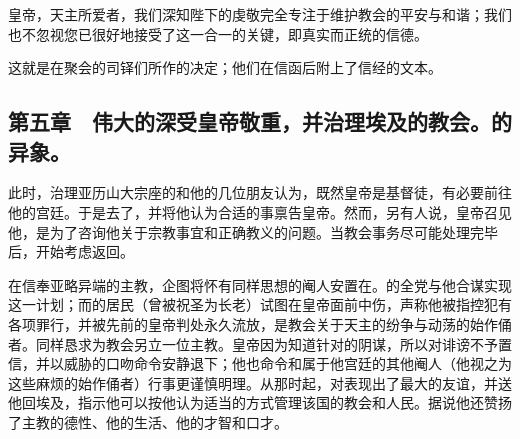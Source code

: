 皇帝，天主所爱者，我们深知陛下的虔敬完全专注于维护教会的平安与和谐；我们也不忽视您已很好地接受了这一合一的关键，即真实而正统的信德。\par

\par

这就是在聚会的司铎们所作的决定；他们在信函后附上了信经的文本。\par


\subsection{第五章　伟大的深受皇帝敬重，并治理埃及的教会。的异象。}

此时，治理亚历山大宗座的和他的几位朋友认为，既然皇帝是基督徒，有必要前往他的宫廷。于是去了，并将他认为合适的事禀告皇帝。然而，另有人说，皇帝召见他，是为了咨询他关于宗教事宜和正确教义的问题。当教会事务尽可能处理完毕后，开始考虑返回。\par

在信奉亚略异端的主教，企图将怀有同样思想的阉人安置在。的全党与他合谋实现这一计划；而的居民（曾被祝圣为长老）试图在皇帝面前中伤，声称他被指控犯有各项罪行，并被先前的皇帝判处永久流放，是教会关于天主的纷争与动荡的始作俑者。同样恳求为教会另立一位主教。皇帝因为知道针对的阴谋，所以对诽谤不予置信，并以威胁的口吻命令安静退下；他也命令和属于他宫廷的其他阉人（他视之为这些麻烦的始作俑者）行事更谨慎明理。从那时起，对表现出了最大的友谊，并送他回埃及，指示他可以按他认为适当的方式管理该国的教会和人民。据说他还赞扬了主教的德性、他的生活、他的才智和口才。\par

